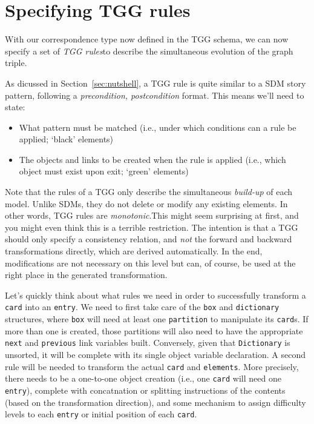 \newpage
\section{Specifying TGG rules}
\genHeader

With our correspondence type now defined in the TGG schema, we can now specify a set of \emph{TGG rules}to describe the simultaneous
evolution of the graph triple.

As dicussed in Section~\ref{sec:nutshell}, a TGG rule is quite similar to a SDM story pattern, following a \emph{precondition, postcondition}
format. This means we'll need to state:
\begin{itemize}
  \item What pattern must be matched (i.e., under which conditions can a rule be applied; `black' elements)
  \item The objects and links to be created when the rule is applied (i.e., which object must exist upon exit; `green' elements)
\end{itemize}

\vspace{0.5cm}

Note that the rules of a TGG only describe the simultaneous \emph{build-up} of each model. Unlike SDMs, they do not delete or modify any existing elements.
In other words, TGG rules are \emph{monotonic}.This might seem surprising at first, and you might even think this is a terrible restriction.
The intention is that a TGG should only specify a consistency relation, and \emph{not} the forward and backward transformations directly, which are derived
automatically. In the end, modifications are not necessary on this level but can, of course, be used at the right place in the generated transformation.

Let's quickly think about what rules we need in order to successfully transform a \texttt{card} into an \texttt{entry}. We need to first take care of the
\texttt{box} and \texttt{dictionary} structures, where \texttt{box} will need at least one \texttt{partition} to manipulate its \texttt{card}s. If more than one
is created, those partitions will also need to have the appropriate \texttt{next} and \texttt{previous} link variables built. Conversely, given that
\texttt{Dictionary} is unsorted, it will be complete with its single object variable declaration. A second rule will be needed to transform the actual
\texttt{card} and \texttt{elements}. More precisely, there needs to be a one-to-one object creation (i.e., one \texttt{card} will need one \texttt{entry}),
complete with concatnation or splitting instructions of the contents (based on the transformation direction), and some mechanism to assign difficulty levels to
each \texttt{entry} or initial position of each \texttt{card}.







